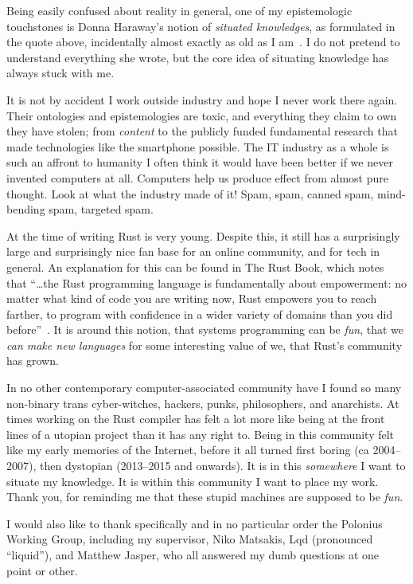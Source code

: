 \documentclass[11pt,a4paper,twoside,openany]{report}
\renewcommand\_{\textunderscore\allowbreak}
\begin{document}
{\footnotesize

  Being easily confused about reality in general, one of my epistemologic
  touchstones is Donna Haraway's notion of \textit{situated knowledges}, as
  formulated in the quote above, incidentally almost exactly as old as I
  am~\cite{haraway}. I do not pretend to understand everything she wrote, but
  the core idea of situating knowledge has always stuck with me.

  It is not by accident I work outside industry and hope I never work there
  again. Their ontologies and epistemologies are toxic, and everything they
  claim to own they have stolen; from \emph{content} to the publicly
  funded fundamental research that made technologies like the smartphone
  possible. The IT industry as a whole is such an affront to humanity I often
  think it would have been better if we never invented computers at all.
  Computers help us produce effect from almost pure thought. Look at what the
  industry made of it! Spam, spam, canned spam, mind-bending spam, targeted
  spam.

  At the time of writing Rust is very young. Despite this, it still has a
  surprisingly large and surprisingly nice fan base for an online community, and
  for tech in general. An explanation for this can be found in The Rust Book,
  which notes that ``\ldots{}the Rust programming language is fundamentally
  about empowerment: no matter what kind of code you are writing now, Rust
  empowers you to reach farther, to program with confidence in a wider variety
  of domains than you did before''~\cite{nichols_rust_nodate}. It is around this
  notion, that systems programming can be \emph{fun}, that we \emph{can make new
    languages} for some interesting value of we, that Rust's community has
  grown.

  In no other contemporary computer-associated community have I found so many
  non-binary trans cyber-witches, hackers, punks, philosophers, and anarchists.
  At times working on the Rust compiler has felt a lot more like being at the
  front lines of a utopian project than it has any right to. Being in this
  community felt like my early memories of the Internet, before it all turned
  first boring (ca 2004--2007), then dystopian (2013--2015 and onwards). It is
  in this \textit{somewhere} I want to situate my knowledge. It is within this
  community I want to place my work. Thank you, for reminding me that these
  stupid machines are supposed to be \emph{fun}.

  I would also like to thank specifically and in no particular order the
  Polonius Working Group, including my supervisor, Niko Matsakis, Lqd
  (pronounced ``liquid''), and Matthew Jasper, who all answered my dumb
  questions at one point or other.

}
\end{document}
